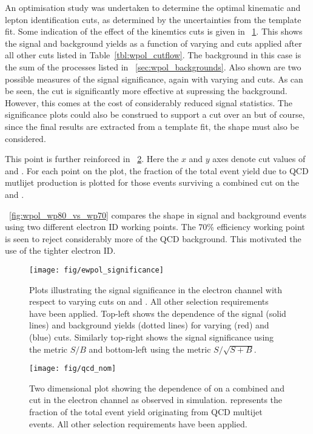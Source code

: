 An optimisation study was undertaken to determine the optimal kinematic and
lepton identification cuts, as determined by the uncertainties from the template
fit. Some indication of the effect of the kinemtics cuts is given in
\fig~\ref{fig:wpol_ele_significance}. This shows the signal and background
yields as a function of varying \MET and \MT cuts applied after all other cuts
listed in Table~\ref{tbl:wpol_cutflow}. The background in this case is the sum
of the processes listed in \sec~\ref{sec:wpol_backgrounds}. Also shown are
two possible measures of the signal significance, again with varying \MET and
\MT cuts. As can be seen, the \MET cut is significantly more effective at
supressing the background. However, this comes at the cost of considerably
reduced signal statistics. The significance plots could also be construed to
support a \MET cut over an \MT but of course, since the final results are
extracted from a template fit, the \LP shape must also be considered.

This point is further reinforced in \fig~\ref{fig:wpol_met_mt_fqcd}. Here the
$x$ and $y$ axes denote cut values of \MET and \MT. For each point on the plot,
the fraction of the total event yield due to \ac{QCD} mutlijet production is
plotted for those events surviving a combined cut on the \MET and \MT.

\fig~\ref{fig:wpol_wp80_vs_wp70} compares the \LP shape in signal and
background events using two different electron ID working points. The 70\%
efficiency working point is seen to reject considerably more of the \ac{QCD}
background. This motivated the use of the tighter electron ID.

\begin{figure}[h!]
\texttt{[image: fig/ewpol\_significance]}
\caption[Plots illustrating the signal significance in the electron channel with
respect to varying cuts on \MET and \MT.]{Plots illustrating the signal
  significance in the electron channel with respect to varying cuts on \MET and
  \MT. All other selection requirements have been applied. Top-left shows the
  dependence of the signal (solid lines) and background yields (dotted lines)
  for varying \MET (red) and \MT (blue) cuts. Similarly top-right shows the
  signal significance using the metric $S/B$ and bottom-left using the metric
  $S/\sqrt{S+B}$.}
\label{fig:wpol_ele_significance}
\end{figure}

\begin{figure}[h!]
\texttt{[image: fig/qcd\_nom]}
\caption{Two dimensional plot showing the dependence of \fQCD on a combined \MET
  and \MT cut in the electron channel as observed in simulation. \fQCD
  represents the fraction of the total event yield originating from \ac{QCD}
  multijet events. All other selection requirements have been applied. }
\label{fig:wpol_met_mt_fqcd}
\end{figure}


